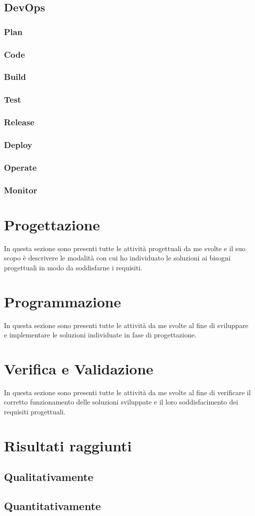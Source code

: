 \subsection{DevOps}
\subsubsection*{Plan}
\subsubsection*{Code}
\subsubsection*{Build}
\subsubsection*{Test}
\subsubsection*{Release}
\subsubsection*{Deploy}
\subsubsection*{Operate}
\subsubsection*{Monitor}

\section{Progettazione}
In questa sezione sono presenti tutte le attività progettuali da me svolte e il suo scopo è descrivere le modalità con cui ho individuato le soluzioni ai bisogni progettuali in modo da soddisfarne i requisiti.

\section{Programmazione}
In questa sezione sono presenti tutte le attività da me svolte al fine di sviluppare e implementare le soluzioni individuate in fase di progettazione.

\section{Verifica e Validazione}
In questa sezione sono presenti tutte le attività da me svolte al fine di verificare il corretto funzionamento delle soluzioni sviluppate e il loro soddisfacimento dei requisiti progettuali.

\section{Risultati raggiunti}
\subsection{Qualitativamente}
%

\subsection{Quantitativamente}
%
